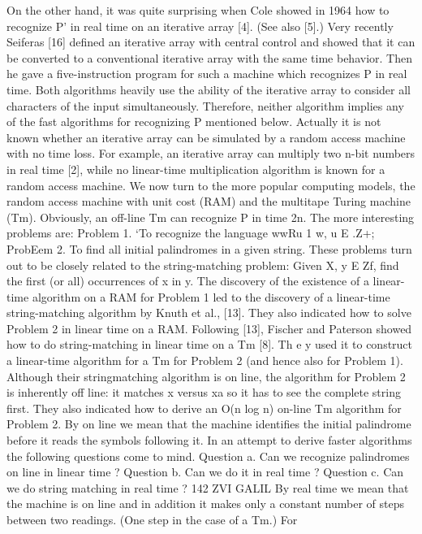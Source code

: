 \documentclass[11pt,a4paper]{report}
\begin{document}
On the other hand, it was quite surprising when Cole showed in 1964 how to recognize
P’ in real time on an iterative array [4]. (See also [5].) Very recently Seiferas [16] defined
an iterative array with central control and showed that it can be converted to a conventional
iterative array with the same time behavior. Then he gave a five-instruction program for
such a machine which recognizes P in real time. Both algorithms heavily use the ability
of the iterative array to consider all characters of the input simultaneously. Therefore,
neither algorithm implies any of the fast algorithms for recognizing P mentioned below.
Actually it is not known whether an iterative array can be simulated by a random access
machine with no time loss. For example, an iterative array can multiply two n-bit numbers
in real time [2], while no linear-time multiplication algorithm is known for a random
access machine.
We now turn to the more popular computing models, the random access machine
with unit cost (RAM) and the multitape Turing machine (Tm). Obviously, an off-line
Tm can recognize P in time 2n. The more interesting problems are:
Problem 1. ‘To recognize the language {wwRu 1 w, u E .Z+};
ProbEem 2. To find all initial palindromes in a given string.
These problems turn out to be closely related to the string-matching problem: Given X,
y E Zf, find the first (or all) occurrences of x in y. The discovery of the existence of a
linear-time algorithm on a RAM for Problem 1 led to the discovery of a linear-time
string-matching algorithm by Knuth et al., [13]. They also indicated how to solve
Problem 2 in linear time on a RAM. Following [13], Fischer and Paterson showed how
to do string-matching in linear time on a Tm [8]. Th e y used it to construct a linear-time
algorithm for a Tm for Problem 2 (and hence also for Problem 1). Although their stringmatching algorithm is on line, the algorithm for Problem 2 is inherently off line: it
matches x versus xa so it has to see the complete string first. They also indicated how to
derive an O(n log n) on-line Tm algorithm for Problem 2. By on line we mean that the
machine identifies the initial palindrome before it reads the symbols following it. In an
attempt to derive faster algorithms the following questions come to mind.
Question a. Can we recognize palindromes on line in linear time ?
Question b. Can we do it in real time ?
Question c. Can we do string matching in real time ? 
142 ZVI GALIL
By real time we mean that the machine is on line and in addition it makes only a
constant number of steps between two readings. (One step in the case of a Tm.) For
\end{document}
